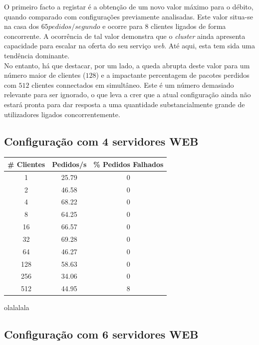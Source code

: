 \newpage


O primeiro facto a registar é a obtenção de um novo valor máximo para o débito, quando comparado com configurações previamente analisadas.
Este valor situa-se na casa dos $65 pedidos/segundo$ e ocorre para $8$ clientes ligados de forma concorrente.
A ocorrência de tal valor demonstra que o \textit{cluster} ainda apresenta capacidade para escalar na oferta do seu serviço \textit{web}.
Até aqui, esta tem sida uma tendência dominante. \\

No entanto, há que destacar, por um lado, a queda abrupta deste valor para um número maior de clientes ($128$) e a impactante percentagem de pacotes perdidos com $512$ clientes connectados em simultâneo.
Este é um número demasiado relevante para ser ignorado, o que leva a crer que a atual configuração ainda não estará pronta para dar resposta a uma quantidade substancialmente grande de utilizadores ligados concorrentemente.

\subsection{Configuração com 4 servidores WEB}


\begin{tabular}{|c|c|c|}
\hline
\textbf{\# Clientes} & \textbf{Pedidos/s} & \textbf{\% Pedidos Falhados} \\ \hline
1 & 25.79 & 0 \\ \hline
2 & 46.58 & 0 \\ \hline
4 & 68.22 & 0 \\ \hline
8 & 64.25 & 0 \\ \hline
16 & 66.57 & 0 \\ \hline
32 & 69.28 & 0 \\ \hline
64 & 46.27 & 0 \\ \hline
128 & 58.63 & 0 \\ \hline
256 & 34.06 & 0 \\ \hline
512 & 44.95 & 8 \\ \hline

\end{tabular}

olalalala


\subsection{Configuração com 6 servidores WEB}

